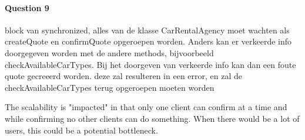\documentclass{ds-report}
\begin{document}
	\paragraph{Question 9} 
	block van synchronized, alles van de klasse CarRentalAgency moet wachten als createQuote en confirmQuote opgeroepen worden. 
	Anders kan er verkeerde info doorgegeven worden met de andere methods, bijvoorbeeld checkAvailableCarTypes. 
	Bij het doorgeven van verkeerde info kan dan een foute quote gecreeerd worden. deze zal resulteren in een error, en zal de checkAvailableCarTypes terug
	opgeroepen moeten worden 
	
	The scalability is "impacted" in that only one client can confirm at a time and while confirming no other clients can do something. When there would be a lot of users, this could be a potential bottleneck. 
	
	\clearpage
	
	
\end{document}
